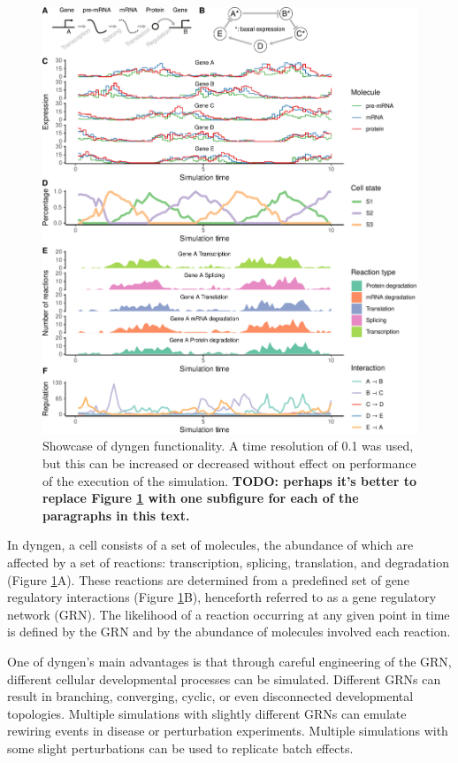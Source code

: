 \begin{figure}[htb!]
	\centering
	\includegraphics[width=\linewidth]{fig/simplecyclic_edited} 
	\caption{Showcase of dyngen functionality. A time resolution of 0.1 was used, but this can be increased or decreased without effect on performance of the execution of the simulation. \textbf{TODO: perhaps it's better to replace Figure \ref{fig:simplecyclic} with one subfigure for each of the paragraphs in this text.}}
	\label{fig:simplecyclic}
\end{figure}

In dyngen, a cell consists of a set of molecules, the abundance of which are affected by a set of reactions: transcription, splicing, translation, and degradation (Figure \ref{fig:simplecyclic}A). These reactions are determined from a predefined set of gene regulatory interactions (Figure \ref{fig:simplecyclic}B), henceforth referred to as a gene regulatory network (GRN). The likelihood of a reaction occurring at any given point in time is defined by the GRN and by the abundance of molecules involved each reaction.

One of dyngen's main advantages is that through careful engineering of the GRN, different cellular developmental processes can be simulated. Different GRNs can result in branching, converging, cyclic, or even disconnected developmental topologies. Multiple simulations with slightly different GRNs can emulate rewiring events in disease or perturbation experiments. %
Multiple simulations with some slight perturbations can be used to replicate batch effects. 

